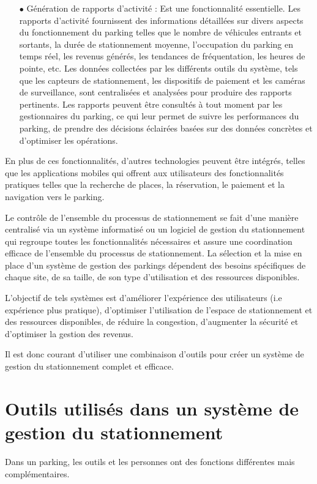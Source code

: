 \begin{enumerate}
   \item [$\bullet$] Génération de rapports d'activité : Est une fonctionnalité essentielle. Les rapports d'activité fournissent des informations détaillées sur divers aspects du fonctionnement du parking telles que le nombre de véhicules entrants et sortants, la durée de stationnement moyenne, l'occupation du parking en temps réel, les revenus générés, les tendances de fréquentation, les heures de pointe, etc. Les données collectées par les différents outils du système, tels que les capteurs de stationnement, les dispositifs de paiement et les caméras de surveillance, sont centralisées et analysées pour produire des rapports pertinents. Les rapports peuvent être consultés à tout moment par les gestionnaires du parking, ce qui leur permet de suivre les performances du parking, de prendre des décisions éclairées basées sur des données concrètes et d'optimiser les opérations.

\end{enumerate}

En plus de ces fonctionnalités, d'autres technologies peuvent être intégrés, telles que les applications mobiles qui offrent aux utilisateurs des fonctionnalités pratiques telles que la recherche de places, la réservation, le paiement et la navigation vers le parking.

Le contrôle de l'ensemble du processus de stationnement se fait d'une manière centralisé via un système informatisé ou un logiciel de gestion du stationnement qui regroupe toutes les fonctionnalités nécessaires et assure une coordination efficace de l'ensemble du processus de stationnement. 
La sélection et la mise en place d'un système de gestion des parkings dépendent des besoins spécifiques de chaque site, de sa taille, de son type d'utilisation et des ressources disponibles. 

L'objectif de tels systèmes est d'améliorer l'expérience des utilisateurs (i.e expérience plus pratique), d'optimiser l'utilisation de l'espace de stationnement et des ressources disponibles, de réduire la congestion, d'augmenter la sécurité et d'optimiser la gestion des revenus.

Il est donc courant d'utiliser une combinaison d'outils pour créer un système de gestion du stationnement complet et efficace. 


\section{Outils utilisés dans un système de gestion du stationnement}
Dans un parking, les outils et les personnes ont des fonctions différentes mais complémentaires.

